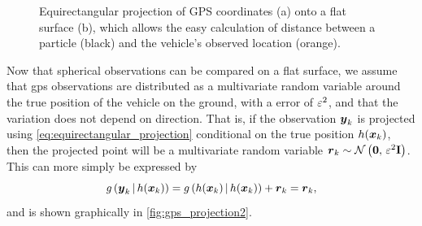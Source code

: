 \begin{knitrout}\small
{}\color{fgcolor}\begin{figure}

{\centering {}

}

\caption[Equirectangular projection of GPS coordinates onto a flat surface]{Equirectangular projection of GPS coordinates ({\sc a}) onto a flat surface ({\sc b}), which allows the easy calculation of distance between a particle (black) and the vehicle's observed location (orange).}\label{fig:gps_projection}
\end{figure}


\end{knitrout}


Now that spherical observations can be compared on a flat surface, we assume that \gls{gps} observations are distributed as a multivariate random variable around the true position of the vehicle on the ground, with a \GPS{} error of $\varepsilon^2$, and that the variation does not depend on direction. That is, if the observation $\boldsymbol{y}_k$ is projected using \cref{eq:equirectangular_projection} conditional on the true position $h(\boldsymbol x_k)$, then the projected point will be a multivariate random variable $\boldsymbol{r}_k \sim \mathcal{N}\left(\boldsymbol{0},\, \varepsilon^2 \mathbf{I}\right)$. This can more simply be expressed by
\begin{equation}
\label{eq:gps_error_model}
g\left(\boldsymbol{y}_k\,|\,h(\boldsymbol x_k)\right) =
    g\left(h(\boldsymbol x_k)\,|\,h(\boldsymbol x_k)\right) + \boldsymbol{r}_k
    = \boldsymbol{r}_k,
\end{equation}
and is shown graphically in \cref{fig:gps_projection2}.




